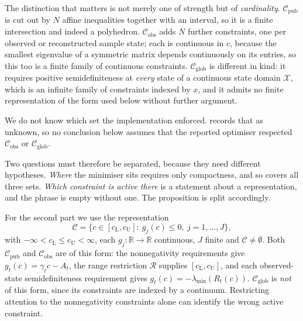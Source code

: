 \documentclass[11pt]{article}
\theoremstyle{definition}
\newcommand{\R}{\mathbb{R}}
\begin{document}
The distinction that matters is not merely one of strength but of \emph{cardinality}. $\mathcal C_{\text{pub}}$ is cut out by $N$ affine inequalities together with an interval, so it is a finite intersection and indeed a polyhedron. $\mathcal C_{\text{obs}}$ adds $N$ further constraints, one per observed or reconstructed sample state; each is continuous in $c$, because the smallest eigenvalue of a symmetric matrix depends continuously on its entries, so this too is a finite family of continuous constraints. $\mathcal C_{\text{glob}}$ is different in kind: it requires positive semidefiniteness at \emph{every} state of a continuous state domain $\mathcal X$, which is an infinite family of constraints indexed by $x$, and it admits no finite representation of the form used below without further argument.

We do not know which set the implementation enforced.  records that as unknown, so no conclusion below assumes that the reported optimiser respected $\mathcal C_{\text{obs}}$ or $\mathcal C_{\text{glob}}$.

Two questions must therefore be separated, because they need different hypotheses. \emph{Where} the minimiser sits requires only compactness, and so covers all three sets. \emph{Which constraint is active there} is a statement about a representation, and the phrase is empty without one. The proposition is split accordingly.

For the second part we use the representation
\begin{equation}\label{eq:constraint_representation}
\mathcal C=\bigl\{c\in[c_{\mathrm L},c_{\mathrm U}]:\ g_j(c)\le0,\ j=1,\dots,J\bigr\},
\end{equation}
with $-\infty<c_{\mathrm L}\le c_{\mathrm U}<\infty$, each $g_j:\R\to\R$ continuous, $J$ finite and $\mathcal C\ne\emptyset$. Both $\mathcal C_{\text{pub}}$ and $\mathcal C_{\text{obs}}$ are of this form: the nonnegativity requirements give $g_t(c)=\gamma_tc-A_t$, the range restriction $\mathcal R$ supplies $[c_{\mathrm L},c_{\mathrm U}]$, and each observed-state semidefiniteness requirement gives $g_t(c)=-\lambda_{\min}(R_t(c))$. $\mathcal C_{\text{glob}}$ is \emph{not} of this form, since its constraints are indexed by a continuum. Restricting attention to the nonnegativity constraints alone can identify the wrong active constraint.
\end{document}

